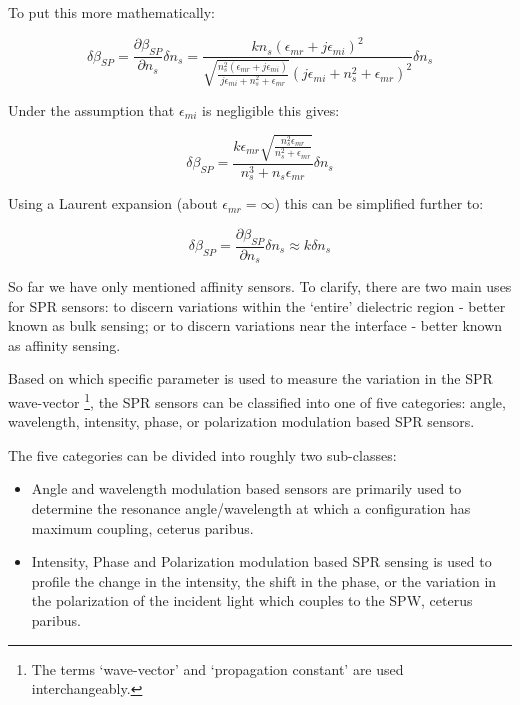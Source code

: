 To put this more mathematically:

\begin{equation}
\delta \beta_{SP} = \frac{\partial \beta_{SP}}{\partial n_s} \delta n_s = \frac{k n_s (\epsilon_{mr} +j \epsilon_{mi} )^2}{\sqrt{\frac{n_s^2 (\epsilon_{mr} +j \epsilon_{mi} )}{j
   \epsilon_{mi} +n_s^2+\epsilon_{mr} }} \left(j \epsilon_{mi} +n_s^2+\epsilon_{mr} \right)^2} \delta n_s
\end{equation}

Under the assumption that $\epsilon_{mi}$ is negligible this gives:

\begin{equation}
\delta \beta_{SP} = \frac{k \epsilon_{mr}  \sqrt{\frac{n_s^2 \epsilon_{mr}}{n_s^2+\epsilon_{mr} }}}{n_s^3+n_s \epsilon_{mr}} \delta n_s
\end{equation}

Using a Laurent expansion (about $\epsilon_{mr} = \infty$) this can be simplified further to:

\begin{equation}\label{SPR_var}
\delta \beta_{SP} = \frac{\partial \beta_{SP}}{\partial n_s} \delta n_s \approx k \delta n_s
\end{equation}

So far we have only mentioned affinity sensors. To clarify, there are two main uses for SPR sensors: to discern variations within the `entire' dielectric region - better known as bulk sensing; or to discern variations near the interface - better known as affinity sensing.  

Based on which specific parameter is used to measure the variation in the SPR wave-vector \footnote{The terms `wave-vector' and `propagation constant' are used interchangeably.}, the SPR sensors can be classified into one of five categories: angle, wavelength, intensity, phase, or polarization modulation based SPR sensors.  

The five categories can be divided into roughly two sub-classes:

\begin{itemize}
\item Angle and wavelength modulation based sensors are primarily used to determine the resonance angle/wavelength at which a configuration has maximum coupling, ceterus paribus.
 
\item Intensity, Phase and Polarization modulation based SPR sensing is used to profile the change in the intensity, the shift in the phase, or the variation in the polarization of the incident light which couples to the SPW, ceterus paribus. 
\end{itemize}


